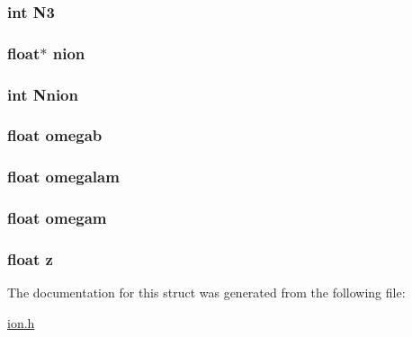 \hypertarget{structparams_a4e8e9c2bf9e06ae07ef364c05a073302}{
\subsubsection[{N3}]{\setlength{\rightskip}{0pt plus 5cm}int N3}}\label{structparams_a4e8e9c2bf9e06ae07ef364c05a073302}
\hypertarget{structparams_ad55bc1e5d127b88c3b3bdf08ce83e026}{
\subsubsection[{nion}]{\setlength{\rightskip}{0pt plus 5cm}float$\ast$ nion}}\label{structparams_ad55bc1e5d127b88c3b3bdf08ce83e026}
\hypertarget{structparams_ab6d8d0b2c7ee385271e90e51818623bc}{
\subsubsection[{Nnion}]{\setlength{\rightskip}{0pt plus 5cm}int Nnion}}\label{structparams_ab6d8d0b2c7ee385271e90e51818623bc}
\hypertarget{structparams_aeaccd726adbb20f37e40458f9fc1789c}{
\subsubsection[{omegab}]{\setlength{\rightskip}{0pt plus 5cm}float omegab}}\label{structparams_aeaccd726adbb20f37e40458f9fc1789c}
\hypertarget{structparams_ac99cfe381d57df39c2cdb6d5c8f6f548}{
\subsubsection[{omegalam}]{\setlength{\rightskip}{0pt plus 5cm}float omegalam}}\label{structparams_ac99cfe381d57df39c2cdb6d5c8f6f548}
\hypertarget{structparams_a1143ccc333b13b81d68f112fc1122acd}{
\subsubsection[{omegam}]{\setlength{\rightskip}{0pt plus 5cm}float omegam}}\label{structparams_a1143ccc333b13b81d68f112fc1122acd}
\hypertarget{structparams_af73583b1e980b0aa03f9884812e9fd4d}{
\subsubsection[{z}]{\setlength{\rightskip}{0pt plus 5cm}float z}}\label{structparams_af73583b1e980b0aa03f9884812e9fd4d}


The documentation for this struct was generated from the following file\+:\begin{DoxyCompactItemize}
\item 
\hyperlink{ion_8h}{ion.\+h}\end{DoxyCompactItemize}
